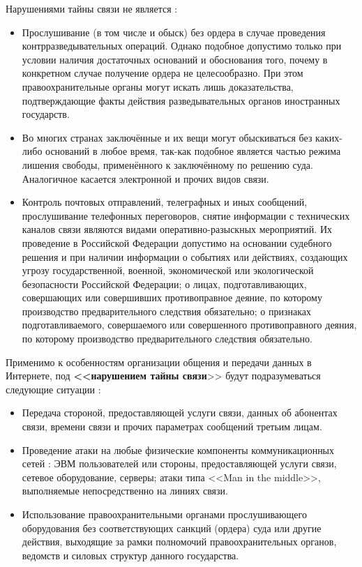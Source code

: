 Нарушениями тайны связи не является :
\begin{itemize} %
		\item Прослушивание (в том числе и обыск) без ордера   в случае проведения контрразведывательных операций. Однако подобное допустимо только при условии наличия достаточных оснований и обоснования того, почему в конкретном случае получение ордера не целесообразно. При этом правоохранительные органы могут искать лишь доказательства, подтверждающие факты действия разведывательных органов иностранных государств.
		\item Во многих странах заключённые и их вещи могут обыскиваться без каких-либо оснований в любое время, так-как подобное является частью режима лишения свободы, применённого к заключённому по решению суда. Аналогичное касается электронной и прочих видов связи.
		\item Контроль почтовых отправлений, телеграфных и иных сообщений, прослушивание телефонных переговоров, снятие информации с технических каналов связи являются видами оперативно-разыскных мероприятий. Их проведение в Российской Федерации  допустимо на основании судебного решения и при наличии информации о  событиях или действиях, создающих угрозу государственной, военной, экономической или экологической безопасности Российской Федерации; о лицах, подготавливающих, совершающих или совершивших противоправное деяние, по которому производство предварительного следствия обязательно; о признаках подготавливаемого, совершаемого или совершенного противоправного деяния, по которому производство предварительного следствия обязательно.
		
\end{itemize}

 Применимо к особенностям организации общения и передачи данных в Интернете, под   \textbf{ <<нарушением тайны связи}>> будут подразумеваться следующие ситуации : 
\begin{itemize}
	\item Передача стороной, предоставляющей услуги связи, данных об абонентах связи, времени связи и прочих параметрах сообщений третьим лицам.
	\item  Проведение атаки на любые  физические компоненты коммуникационных сетей  : ЭВМ пользователей или стороны, предоставляющей услуги связи, сетевое оборудование, серверы; атаки типа <<Man in the middle>>, выполняемые непосредственно на линиях связи.
	\item Использование правоохранительными органами прослушивающего оборудования без соответствующих санкций (ордера) суда или другие действия, выходящие за рамки полномочий правоохранительных органов, ведомств и силовых структур данного государства.
\end{itemize} 
 
\newpage %